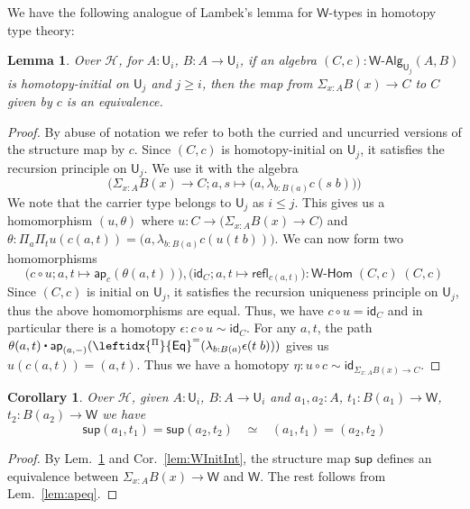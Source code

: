 \documentclass[reqno,10pt,a4paper,oneside]{amsart}
\newcommand{\comp}{\circ}
\newcommand{\idfun}[1]{\mathsf{id}_{#1}}
\newcommand{\prd}[1]{\Pi_{#1}}
\newcommand{\sm}[1]{\Sigma_{#1}}
\newcommand{\lam}[1]{\lambda_{#1}}
\newcommand{\refl}{\mathsf{refl}}
\newcommand{\W}{\mathsf{W}}
\newcommand{\wsup}{\mathsf{sup}}
\newcommand{\funext}{\leftidx{^\Pi}{\mathsf{Eq}}^{=}}
\newcommand{\UU}{\mathsf{U}}
\newcommand{\WAlg}{\mathsf{W}\text{-}\mathsf{Alg}}
\newcommand{\WHom}{\mathsf{W}\text{-}\mathsf{Hom}}
\newcommand{\app}{\mathsf{ap}}
\newcommand{\Hint}{\mathcal{H}}
\newcommand{\ct}{%
  \mathchoice{\mathbin{\raisebox{0.5ex}{$\displaystyle\centerdot$}}}%
             {\mathbin{\raisebox{0.5ex}{$\centerdot$}}}%
             {\mathbin{\raisebox{0.25ex}{$\scriptstyle\,\centerdot\,$}}}%
             {\mathbin{\raisebox{0.1ex}{$\scriptscriptstyle\,\centerdot\,$}}}}
\numberwithin{equation}{section}
\theoremstyle{mythm}
\newtheorem{lemma}[theorem]{Lemma}
\newtheorem{corollary}[theorem]{Corollary}
\theoremstyle{mydef}
\theoremstyle{myrmk}
\begin{document}
We have the following analogue of Lambek's lemma for $\W$-types in homotopy type theory:
\begin{lemma}\label{lem:IntLambek}
Over $\Hint$, for $A:\UU_i$, $B : A \to \UU_i$, if an algebra $(C,c) : \WAlg_{\UU_j}(A,B)$ is homotopy-initial on $\UU_j$ and $j \geq i$, then the map from $\sm{x:A} B(x) \to C$ to $C$ given by $c$ is an equivalence.
\end{lemma}
\begin{proof}
By abuse of notation we refer to both the curried and uncurried versions of the structure map by $c$. Since $(C,c)$ is homotopy-initial on $\UU_j$, it satisfies the recursion principle on $\UU_j$. We use it with the algebra \[\Big(\sm{x:A} B(x) \to C; a,s \mapsto \big(a,\lam{b:B(a)} c(s\;b)\big)\Big)\]
We note that the carrier type belongs to $\UU_j$ as $i \leq j$. This gives us a homomorphism $(u,\theta)$ where $u : C \to \big(\sm{x:A} B(x) \to C\big)$ and $\theta : \prd{a}\prd{t} u(c(a,t)) = \big(a,\lam{b:B(a)} c(u(t\;b))\big)$.  We can now form two homomorphisms
\[\big(c \comp u; a,t \mapsto \app_c(\theta(a,t))\big), \big(\idfun{C}; a,t \mapsto \refl_{c(a,t)}\big) : \WHom \; (C,c) \; (C,c)\]
Since $(C,c)$ is initial on $\UU_j$, it satisfies the recursion uniqueness principle on $\UU_j$, thus the above homomorphisms are equal. Thus, we have $c \comp u = \idfun{C}$ and in particular there is a homotopy $\epsilon : c \comp u \sim \idfun{C}$. For any $a,t$, the path $\theta(a,t) \ct \app_{(a,-)}(\funext(\lam{b:B(a)} \epsilon(t\;b)))$ gives us $u(c(a,t)) = (a,t)$. Thus we have a homotopy $\eta : u \comp c \sim \idfun{\sm{x:A} B(x) \to C}$.
\end{proof}

\begin{corollary}\label{lem:suppath}
Over $\Hint$, given $A:\UU_i$, $B : A \to \UU_i$ and $a_1,a_2:A$, $t_1 : B(a_1) \to \W$, $t_2 : B(a_2) \to \W$ we have
\[ \wsup(a_1,t_1) = \wsup(a_2,t_2) \;\;\; \simeq \;\;\; (a_1,t_1) = (a_2,t_2)\]
\end{corollary}
\begin{proof}
By Lem.~\ref{lem:IntLambek} and Cor.~\ref{lem:WInitInt}, the structure map $\wsup$ defines an equivalence between $\sm{x:A} B(x) \to \W$ and $\W$. The rest follows from Lem.~\ref{lem:apeq}.
\end{proof}
\end{document}
